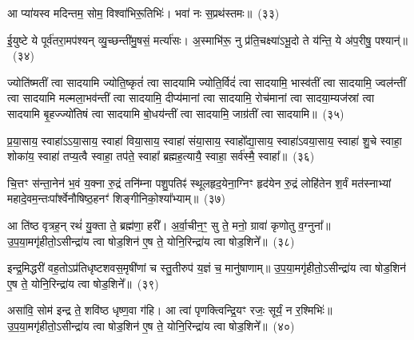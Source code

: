 {\anuvakamend[{त॒रणि॑र्विꣳश॒तिः}]}%

आ प्या॑यस्व मदिन्तम॒ सोम॒ विश्वा॑भिरू॒तिभिः॑। भवा॑ नः स॒प्रथ॑स्तमः॥~(३३)\ip

{\anuvakamend[{आ प्या॑यस्व॒ नव॑}]}%

ई॒युष्टे ये पूर्व॑तरा॒मप॑श्यन् व्यु॒च्छन्ती॑मु॒षसं॒ मर्त्या॑सः। अ॒स्माभि॑रू॒ नु प्र॑ति॒चक्ष्या॑\-ऽभू॒दो ते य॑न्ति॒ ये अ॑प॒रीषु॒ पश्यान्॑॥~(३४)\ip

{\anuvakamend[{ई॒युरेका॒न्नविꣳ॑शतिः}]}%

ज्योति॑ष्मतीं त्वा सादयामि ज्योति॒ष्कृतं॑ त्वा सादयामि ज्योति॒र्विदं॑ त्वा सादयामि॒ भास्व॑तीं त्वा सादयामि॒ ज्वल॑न्तीं त्वा सादयामि मल्मला॒भव॑न्तीं त्वा सादयामि॒ दीप्य॑मानां त्वा सादयामि॒ रोच॑मानां त्वा सादया॒म्यज॑स्रां त्वा सादयामि बृ॒हज्ज्यो॑तिषं त्वा सादयामि बो॒धय॑न्तीं त्वा सादयामि॒ जाग्र॑तीं त्वा सादयामि॥~(३५)\ip

{\anuvakamend[{ज्योति॑ष्मती॒ꣳ॒ षट्त्रिꣳ॑शत्}]}%

प्र॒या॒साय॒ स्वाहा॑\-ऽऽ\-या॒साय॒ स्वाहा॑ विया॒साय॒ स्वाहा॑ संया॒साय॒ स्वाहो᳚द्या॒साय॒ स्वाहा॑\-ऽवया॒साय॒ स्वाहा॑ शु॒चे स्वाहा॒ शोका॑य॒ स्वाहा॑ तप्य॒त्वै स्वाहा॒ तप॑ते॒ स्वाहा᳚ ब्रह्मह॒त्यायै॒ स्वाहा॒ सर्व॑स्मै॒ स्वाहा᳚॥~(३६)\ip

{\anuvakamend[{प्र॒या॒साय॒ चतु॑र्विꣳशतिः}]}%

चि॒त्तꣳ स॑न्ता॒नेन॑ भ॒वं य॒क्ना रु॒द्रं तनि॑म्ना पशु॒पतिꣴ॑ स्थूलहृद॒येना॒ग्निꣳ हृद॑येन रु॒द्रं लोहि॑तेन श॒र्वं मत॑स्नाभ्यां महादे॒व\-म॒न्तःपा᳚र्श्वेनौषिष्ठ॒\-हनꣳ॑ शिङ्गीनिको॒श्या᳚भ्याम्॥~(३७)\ip

{\anuvakamend[{चि॒त्तम॒ष्टाद॑श}]}%

आ ति॑ष्ठ वृत्रह॒न् रथं॑ यु॒क्ता ते॒ ब्रह्म॑णा॒ हरी᳚। अ॒र्वा॒चीन॒ꣳ॒ सु ते॒ मनो॒ ग्रावा॑ कृणोतु व॒ग्नुना᳚॥ उ॒प॒या॒मगृ॑हीतो॒\-ऽसीन्द्रा॑य त्वा षोड॒शिन॑ ए॒ष ते॒ योनि॒रिन्द्रा॑य त्वा षोड॒शिने᳚॥~(३८)\ip

{\anuvakamend[{आ ति॑ष्ठ॒ षड्विꣳ॑शतिः}]}%

इन्द्र॒मिद्धरी॑ वह॒तो\-ऽप्र॑तिधृष्टशवस॒मृषी॑णां च स्तु॒तीरुप॑ य॒ज्ञं च॒ मानु॑षाणाम्॥ उ॒प॒या॒मगृ॑हीतो॒\-ऽसीन्द्रा॑य त्वा षोड॒शिन॑ ए॒ष ते॒ योनि॒रिन्द्रा॑य त्वा षोड॒शिने᳚॥~(३९)\ip

{\anuvakamend[{इन्द्र॒मित् त्रयो॑विꣳशतिः}]}%

असा॑वि॒ सोम॑ इन्द्र ते॒ शवि॑ष्ठ धृष्ण॒वा ग॑हि। आ त्वा॑ पृणक्त्विन्द्रि॒यꣳ रजः॒ सूर्यं॒ न र॒श्मिभिः॑॥ उ॒प॒या॒मगृ॑हीतो॒\-ऽसीन्द्रा॑य त्वा षोड॒शिन॑ ए॒ष ते॒ योनि॒रिन्द्रा॑य त्वा षोड॒शिने᳚॥~(४०)\ip


